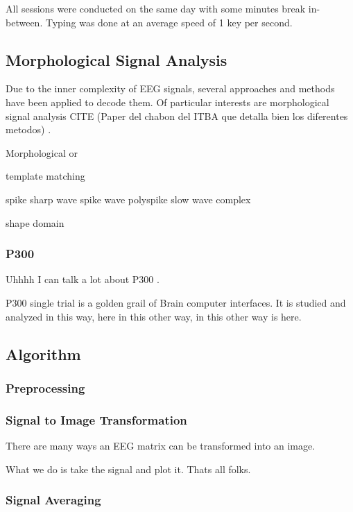 \documentclass[entropy,article,submit,moreauthors,pdftex,10pt,a4paper]{mdpi}
\begin{document}
All sessions were conducted on the same day with some minutes break in-between. Typing was done at an average speed of 1 key per second.  

\subsection{Morphological Signal Analysis}

Due to the inner complexity of EEG signals, several approaches and methods have been applied to decode them.  Of particular interests are morphological signal analysis 
CITE (Paper del chabon del ITBA que detalla bien los diferentes metodos) \citep{Alvarado-Gonzalez2016}.

Morphological or 

template matching

spike
sharp wave
spike wave
polyspike 
slow wave complex

shape domain

\subsubsection{P300}

Uhhhh I can talk a lot about P300 \citep{Knuth2006}.

P300 single trial is a golden grail of Brain computer interfaces.  It is studied and analyzed in this way, here in this other way, in this other way is here.

\subsection{Algorithm}

\subsubsection{Preprocessing}

\subsubsection{Signal to Image Transformation}

There are many ways an EEG matrix can be transformed into an image.

What we do is take the signal and plot it.  Thats all folks.

\subsubsection{Signal Averaging}
\end{document}
